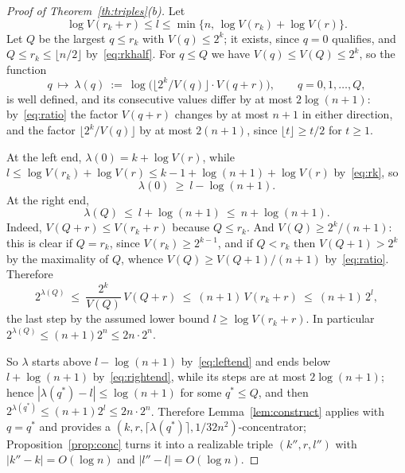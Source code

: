 \documentclass[11pt,a4paper]{article}
\theoremstyle{definition}
\newtheorem{remark}[theorem]{Remark}
\newcommand{\eps}{\varepsilon}
\renewcommand{\le}{\leqslant}
\renewcommand{\ge}{\geqslant}
\begin{document}
\begin{proof}[Proof of Theorem~\ref{th:triples}(b)]
Let 
$$
\log V(r_k+r)\le l\le\min\{n,\,\log V(r_k)+\log V(r)\}.
$$ 
Let $Q$ be the largest $q\le r_k$ with $V(q)\le2^k$; it exists, since $q=0$
qualifies, and $Q\le r_k\le\lfloor n/2\rfloor$ by~\eqref{eq:rkhalf}. For
$q\le Q$ we have $V(q)\le V(Q)\le2^k$, so the function
\[
  q\ \longmapsto\ \lambda(q)\ :=\
  \log\bigl(\lfloor2^k/V(q)\rfloor\cdot V(q+r)\bigr),
  \qquad q=0,1,\dots,Q ,
\]
is well defined, and its consecutive values differ by at most $2\log(n+1)$:
by~\eqref{eq:ratio} the factor $V(q+r)$ changes by at most $n+1$ in either
direction, and the factor $\lfloor2^k/V(q)\rfloor$ by at most $2(n+1)$, since
$\lfloor t\rfloor\ge t/2$ for $t\ge1$.

At the left end, $\lambda(0)=k+\log V(r)$, while
$l\le\log V(r_k)+\log V(r)\le k-1+\log(n+1)+\log V(r)$ by~\eqref{eq:rk}, so
\begin{equation}\label{eq:leftend}
  \lambda(0)\ \ge\ l-\log(n+1).
\end{equation}
At the right end,
\begin{equation}\label{eq:rightend}
  \lambda(Q)\ \le\ l+\log(n+1)\ \le\ n+\log(n+1).
\end{equation}
Indeed, $V(Q+r)\le V(r_k+r)$ because $Q\le r_k$. And $V(Q)\ge2^k/(n+1)$:
this is clear if $Q=r_k$, since $V(r_k)\ge2^{k-1}$, and if $Q<r_k$ then
$V(Q+1)>2^k$ by the maximality of $Q$, whence $V(Q)\ge V(Q+1)/(n+1)$
by~\eqref{eq:ratio}. Therefore
\[
  2^{\lambda(Q)}\ \le\ \frac{2^k}{V(Q)}\,V(Q+r)\ \le\ (n+1)\,V(r_k+r)
  \ \le\ (n+1)\,2^{l},
\]
the last step by the assumed lower bound $l\ge\log V(r_k+r)$. In particular
$2^{\lambda(Q)}\le(n+1)2^n\le2n\cdot2^n$.

So $\lambda$ starts above $l-\log(n+1)$ by~\eqref{eq:leftend} and ends below
$l+\log(n+1)$ by~\eqref{eq:rightend}, while its steps are at most
$2\log(n+1)$; hence $|\lambda(q^*)-l|\le\log(n+1)$ for some $q^*\le Q$, and
then $2^{\lambda(q^*)}\le(n+1)2^{l}\le2n\cdot2^n$.
Therefore Lemma~\ref{lem:construct} applies with $q=q^*$ and provides a
$(k,r,\lceil\lambda(q^*)\rceil,1/32n^2)$-concentrator;
Proposition~\ref{prop:conc} turns it into a realizable triple $(k'',r,l'')$
with $|k''-k|=O(\log n)$ and $|l''-l|=O(\log n)$.
\end{proof}

\end{document}
